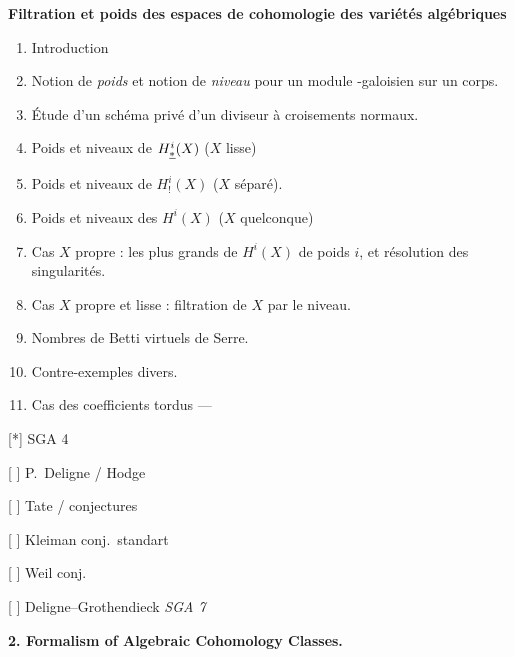 \documentclass[11pt,a4paper]{article}
\begin{document}
\textbf{Filtration et poids  des espaces de cohomologie des
variétés algébriques}

\begin{enumerate}
  \item[0.] Introduction
  \item[1.] Notion de \emph{poids} et notion de \emph{niveau} pour un
  module -galoisien sur un corps. \struck{\ill{}}
  \item[2.] Étude d'un schéma privé d'un diviseur à croisements normaux.
  \item[3.] Poids et niveaux de $H^{i}_{\uncertain{*}}(X)$ ($X$ lisse)
  \item[4.] Poids et niveaux de $H^{i}_{!}(X)$ ($X$ séparé).
  \struck{\ill{}}
  \item[5.] Poids et niveaux des $H^{i}(X)$ ($X$ quelconque)
  \item[6.] Cas $X$ propre : les plus grands  de
  $H^{i}(X)$ de poids $i$, et résolution des singularités.
  \item[7.] Cas $X$ propre et lisse : filtration de $X$ par le niveau.
  \item[8.] Nombres de Betti virtuels de Serre.
  \item[8.] Contre-exemples divers.
  \item[9.] Cas des coefficients tordus ---
\end{enumerate}

[*] SGA 4

[ ] P.\ Deligne / Hodge

[ ] Tate / conjectures

[ ] Kleiman conj.\ standart

[ ] Weil conj.

[ ] Deligne--Grothendieck \emph{SGA 7}


\textbf{2. Formalism of Algebraic Cohomology Classes.}
\end{document}
